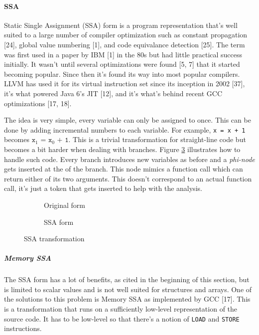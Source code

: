 \documentclass[]{article}
\let\oldparagraph\paragraph
\renewcommand{\paragraph}[1]{\oldparagraph{#1}\mbox{}}
\let\oldsubparagraph\subparagraph
\renewcommand{\subparagraph}[1]{\oldsubparagraph{#1}\mbox{}}
\begin{document}
\paragraph{SSA}\label{ssa}

Static Single Assignment (SSA) form is a program representation that's
well suited to a large number of compiler optimization such as constant
propagation {[}24{]}, global value numbering {[}1{]}, and code
equivalance detection {[}25{]}. The term was first used in a paper by
IBM {[}1{]} in the 80s but had little practical success initially. It
wasn't until several optimizations were found {[}5, 7{]} that it started
becoming popular. Since then it's found its way into most popular
compilers. LLVM has used it for its virtual instruction set since its
inception in 2002 {[}37{]}, it's what powered Java 6's JIT {[}12{]}, and
it's what's behind recent GCC optimizations {[}17, 18{]}.

The idea is very simple, every variable can only be assigned to once.
This can be done by adding incremental numbers to each variable. For
example, \texttt{x\ =\ x\ +\ 1} becomes
\(\texttt{x}_1 \texttt{ = x}_0 \texttt{ + 1}\). This is a trivial
transformation for straight-line code but becomes a bit harder when
dealing with branches. Figure \ref{fig:ssa} illustrates how to handle
such code. Every branch introduces new variables as before and a
\emph{phi-node} gets inserted at the of the branch. This node mimics a
function call which can return either of its two arguments. This doesn't
correspond to an actual function call, it's just a token that gets
inserted to help with the analysis.

\begin{figure}
    \centering
    \begin{subfigure}[t]{0.44\textwidth}
      \resizebox{\linewidth}{!}{}
      \caption{Original form}
      \label{fig:ssa_before}
  \end{subfigure}
    \begin{subfigure}[t]{0.55\textwidth}
      \resizebox{\linewidth}{!}{}
        \caption{SSA form}
        \label{fig:ssa_after}
    \end{subfigure}
    \caption{SSA transformation}
    \label{fig:ssa}
\end{figure}

\subparagraph{Memory SSA}\label{memory-ssa}

The SSA form has a lot of benefits, as cited in the beginning of this
section, but is limited to scalar values and is not well suited for
structures and arrays. One of the solutions to this problem is Memory
SSA as implemented by GCC {[}17{]}. This is a transformation that runs
on a sufficiently low-level representation of the source code. It has to
be low-level so that there's a notion of \texttt{LOAD} and
\texttt{STORE} instructions.
\end{document}
